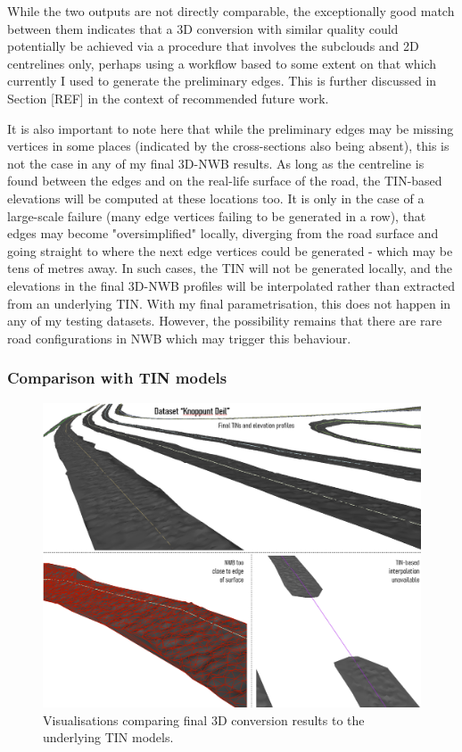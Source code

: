 While the two outputs are not directly comparable, the exceptionally good match between them indicates that a 3D conversion with similar quality could potentially be achieved via a procedure that involves the subclouds and 2D centrelines only, perhaps using a workflow based to some extent on that which currently I used to generate the preliminary edges. This is further discussed in Section [REF] in the context of recommended future work.

It is also important to note here that while the preliminary edges may be missing vertices in some places (indicated by the cross-sections also being absent), this is not the case in any of my final 3D-NWB results. As long as the centreline is found between the edges and on the real-life surface of the road, the TIN-based elevations will be computed at these locations too. It is only in the case of a large-scale failure (many edge vertices failing to be generated in a row), that edges may become "oversimplified" locally, diverging from the road surface and going straight to where the next edge vertices could be generated - which may be tens of metres away. In such cases, the TIN will not be generated locally, and the elevations in the final 3D-NWB profiles will be interpolated rather than extracted from an underlying TIN. With my final parametrisation, this does not happen in any of my testing datasets. However, the possibility remains that there are rare road configurations in NWB which may trigger this behaviour.

\subsubsection{Comparison with TIN models}

\begin{figure}[]
    \centering
    \includegraphics[width=0.9\linewidth]{final_report/figs/elevationinterpolation1.png}
    \caption{Visualisations comparing final 3D conversion results to the underlying TIN models.}
    \label{fig:elevationinterpolation1}
\end{figure}

